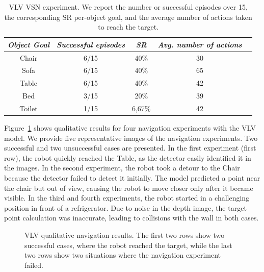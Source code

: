 \begin{table}[t]
\centering
\begin{tabular}{c|cccc}
\toprule
\textit{\textbf{Object Goal}} & \textit{\textbf{Successful episodes}} & \textit{\textbf{SR}} &  \textit{\textbf{Avg. number of actions}}   \\ \midrule
Chair                & 6/15     & 40\%   &   30  \\
Sofa                 & 6/15     & 40\%   &   65  \\
Table                & 6/15     & 40\%   &   42  \\
Bed                  & 3/15     & 20\%   &   39  \\
Toilet               & 1/15     & 6,67\%    &   42  \\ \bottomrule
\end{tabular}
\caption{VLV VSN experiment. We report the number or successful episodes over 15, the corresponding SR per-object goal, and the average number of actions taken to reach the target.}
\label{tab:vlv}
\end{table}

Figure~\ref{fig:vlv_qualitative} shows qualitative results for four navigation experiments with the VLV model.
We provide five representative images of the navigation experiments.
Two successful and two unsuccessful cases are presented.
In the first experiment (first row), the robot quickly reached the Table, as the detector easily identified it in the images.
In the second experiment, the robot took a detour to the Chair because the detector failed to detect it initially.
The model predicted a point near the chair but out of view, causing the robot to move closer only after it became visible.
In the third and fourth experiments, the robot started in a challenging position in front of a refrigerator.
Due to noise in the depth image, the target point calculation was inaccurate, leading to collisions with the wall in both cases.

\begin{figure}[t]
    \centering
        \caption{VLV qualitative navigation results. The first two rows show two successful cases, where the robot reached the target, while the last two rows show two situations where the navigation experiment failed.}
        \label{fig:vlv_qualitative}
\end{figure}

